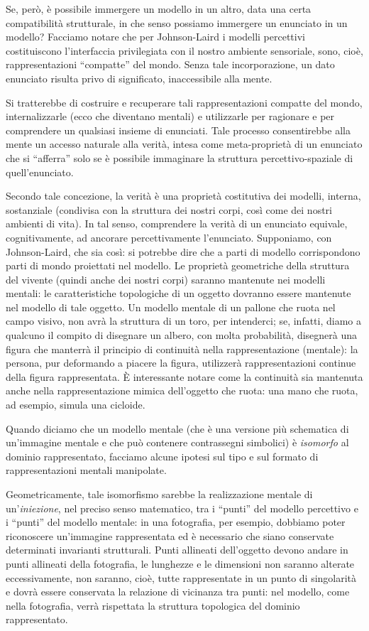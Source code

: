 Se, però, è possibile immergere un modello in un altro, data una certa compatibilità strutturale, in che senso possiamo immergere un enunciato in un modello? Facciamo notare che per Johnson-Laird i modelli percettivi costituiscono l’interfaccia privilegiata con il nostro ambiente sensoriale, sono, cioè, rappresentazioni ``compatte'' del mondo. Senza tale incorporazione, un dato enunciato risulta privo di significato, inaccessibile alla mente.

Si tratterebbe di costruire e recuperare tali rappresentazioni compatte del mondo, internalizzarle (ecco che diventano mentali) e utilizzarle per ragionare e per comprendere un qualsiasi insieme di enunciati. Tale processo consentirebbe alla mente un accesso naturale alla verità, intesa come meta-proprietà di un enunciato che si ``afferra'' solo se è possibile immaginare la struttura percettivo-spaziale di quell’enunciato.

Secondo tale concezione, la verità è una proprietà costitutiva dei modelli, interna, sostanziale (condivisa con la struttura dei nostri corpi, così come dei nostri ambienti di vita). In tal senso, comprendere la verità di un enunciato equivale, cognitivamente, ad ancorare percettivamente l’enunciato. Supponiamo, con Johnson-Laird, che sia così: si potrebbe dire che a parti di modello corrispondono parti di mondo proiettati nel modello. Le proprietà geometriche della struttura del vivente (quindi anche dei nostri corpi) saranno mantenute nei modelli mentali: le caratteristiche topologiche di un oggetto dovranno essere mantenute nel modello di tale oggetto. Un modello mentale di un pallone che ruota nel campo visivo, non avrà la struttura di un toro, per intenderci; se, infatti, diamo a qualcuno il compito di disegnare un albero, con molta probabilità, disegnerà una figura che manterrà il principio di continuità nella rappresentazione (mentale): la persona, pur deformando a piacere la figura, utilizzerà rappresentazioni continue della figura rappresentata. È interessante notare come la continuità sia mantenuta anche nella rappresentazione mimica dell’oggetto che ruota: una mano che ruota, ad esempio, simula una cicloide.

Quando diciamo che un modello mentale (che è una versione più schematica di un’immagine mentale e che può contenere contrassegni simbolici) è \emph{isomorfo} al dominio rappresentato, facciamo alcune ipotesi sul tipo e sul formato di rappresentazioni mentali manipolate.

Geometricamente, tale isomorfismo sarebbe la realizzazione mentale di un’\emph{iniezione}, nel preciso senso matematico, tra i ``punti'' del modello percettivo e i ``punti'' del modello mentale: in una fotografia, per esempio, dobbiamo poter riconoscere un’immagine rappresentata ed è necessario che siano conservate determinati invarianti strutturali. Punti allineati dell’oggetto devono andare in punti allineati della fotografia, le lunghezze e le dimensioni non saranno alterate eccessivamente, non saranno, cioè, tutte rappresentate in un punto di singolarità e dovrà essere conservata la relazione di vicinanza tra punti: nel modello, come nella fotografia, verrà rispettata la struttura topologica del dominio rappresentato.

